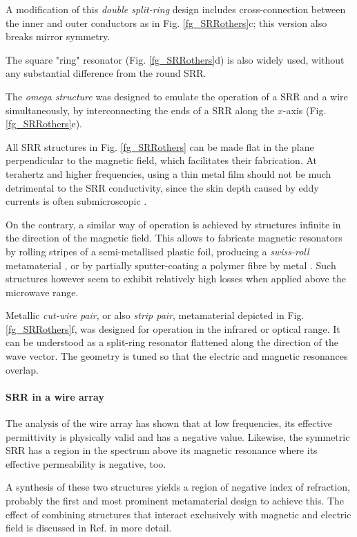 A modification of this \textit{double split-ring} design includes cross-connection between the inner and outer conductors as in Fig. \ref{fg_SRRothers}c; this version also breaks mirror symmetry. 

The square "ring" resonator (Fig. \ref{fg_SRRothers}d) is also widely used, without any substantial difference from the round SRR.

The \textit{omega structure} was designed to emulate the operation of a SRR and a wire simultaneously, by interconnecting the ends of a SRR along the $x$-axis (Fig. \ref{fg_SRRothers}e).

All SRR structures in Fig. \ref{fg_SRRothers} can be made flat in the plane perpendicular to the magnetic field, which facilitates their fabrication. At terahertz and higher frequencies, using a thin metal film should not be much detrimental to the SRR conductivity, since the skin depth caused by eddy currents is often submicroscopic \cite{gibbons2010scalable}.

On the contrary, a similar way of operation is achieved by structures infinite in the direction of the magnetic field. This allows to fabricate magnetic resonators by rolling stripes of a semi-metallised plastic foil, producing a \textit{swiss-roll} metamaterial \cite{gibbons2010scalable}, or by partially sputter-coating a polymer fibre by metal \cite{wang2011fiber}. Such structures however seem to exhibit relatively high losses when applied above the microwave range.

Metallic \textit{cut-wire pair}, or also \textit{strip pair}, metamaterial depicted in Fig. \ref{fg_SRRothers}f, was designed for operation in the infrared or optical range. It can be understood as a split-ring resonator flattened along the direction of the wave vector. The geometry is tuned so that the electric and magnetic resonances overlap.	

\paragraph{SRR in a wire array} %
The analysis of the wire array has shown that at low frequencies, its effective permittivity is physically valid and has a negative value. Likewise, the symmetric SRR has a region in the spectrum above its magnetic resonance where its effective permeability is negative, too.

A synthesis of these two structures yields a region of negative index of refraction, probably the first \cite{pendry2000negative} and most prominent metamaterial design to achieve this. The effect of combining structures that interact exclusively with magnetic and electric field is discussed in Ref. \cite{koschny2004effective} in more detail.

